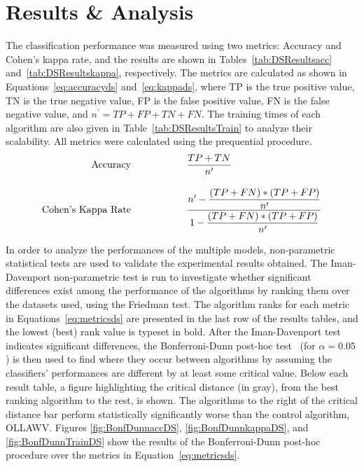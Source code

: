 \documentclass[reqno]{vcuthesis}
\newcommand\tab[1][1cm]{\hspace*{#1}}
\numberwithin{equation}{chapter}
\begin{document}
\section{Results \& Analysis}
The classification performance was measured using two metrics: Accuracy and Cohen's kappa rate, and the results are shown in Tables~\ref{tab:DSResultsacc} and~\ref{tab:DSResultskappa}, respectively. The metrics are calculated as shown in Equations~\ref{eq:accuracyds} and~\ref{eq:kappads}, where TP is the true positive value, TN is the true negative value, FP is the false positive value, FN is the false negative value, and $n^\prime = TP + FP + TN + FN$. The training times of each algorithm are also given in Table~\ref{tab:DSResultsTrain} to analyze their scalability. All metrics were calculated using the prequential procedure. 
\begin{subequations}
\label{eq:metricsds}
\begin{align}
\text{Accuracy} \tab \tab &\dfrac{TP+TN}{n^\prime} \label{eq:accuracyds}\\[10pt]
\text{Cohen's Kappa Rate} \tab \tab &\dfrac{n^\prime - \dfrac{(TP+FN)*(TP+FP)}{n^\prime}}{1 - \dfrac{(TP+FN)*(TP+FP)}{n^\prime}} \label{eq:kappads}
\end{align}
\end{subequations}

In order to analyze the performances of the multiple models, non-parametric statistical tests are used to validate the experimental results obtained. The Iman-Davenport non-parametric test is run to investigate whether significant differences exist among the performance of the algorithms by ranking them over the datasets used, using the Friedman test. The algorithm ranks for each metric in Equations~\eqref{eq:metricsds} are presented in the last row of the results tables, and the lowest (best) rank value is typeset in bold. After the Iman-Davenport test indicates significant differences, the Bonferroni-Dunn post-hoc test~\cite{Dunn1961} (for $\alpha = 0.05$) is then used to find where they occur between algorithms by assuming the classifiers' performances are different by at least some critical value. Below each result table, a figure highlighting the critical distance (in gray), from the best ranking algorithm to the rest, is shown. The algorithms to the right of the critical distance bar perform statistically significantly worse than the control algorithm, OLLAWV. Figures \ref{fig:BonfDunnaccDS}, \ref{fig:BonfDunnkappaDS}, and \ref{fig:BonfDunnTrainDS} show the results of the Bonferroni-Dunn post-hoc procedure over the metrics in Equation~\eqref{eq:metricsds}.
\end{document}
